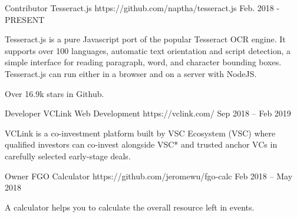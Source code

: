 

\begin{cventries}

  \cventry
    {Contributor} %
    {Tesseract.js} %
    {https://github.com/naptha/tesseract.js} %
    {Feb. 2018 - PRESENT} %
    {
      \begin{cvitems} %
        \item {Tesseract.js is a pure Javascript port of the popular Tesseract OCR engine. It supports over 100 languages, automatic text orientation and script detection, a simple interface for reading paragraph, word, and character bounding boxes. Tesseract.js can run either in a browser and on a server with NodeJS.}
        \item {Over 16.9k stars in Github.}
      \end{cvitems}
    }

  \cventry
    {Developer} %
    {VCLink Web Development} %
    {https://vclink.com/} %
    {Sep 2018 – Feb 2019} %
    {
      \begin{cvitems} %
        \item {VCLink is a co-investment platform built by VSC Ecosystem (VSC) where qualified investors can co-invest alongside VSC* and trusted anchor VCs in carefully selected early-stage deals.}
      \end{cvitems}
    }

  \cventry
    {Owner} %
    {FGO Calculator} %
    {https://github.com/jeromewu/fgo-calc} %
    {Feb 2018 – May 2018} %
    {
      \begin{cvitems} %
        \item {A calculator helps you to calculate the overall resource left in events.}
      \end{cvitems}
    }

\end{cventries}
